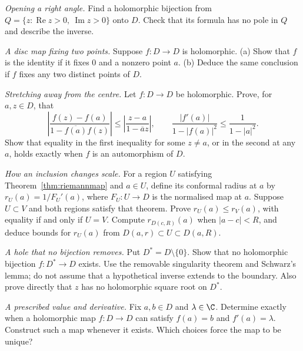 \begin{exercise}[$\star$]\label{ex:quadrant}
\emph{Opening a right angle.} Find a holomorphic bijection from
$Q=\{z:\operatorname{Re}z>0,\ \operatorname{Im}z>0\}$ onto $D$.
Check that its formula has no pole in $Q$ and describe the inverse.
\end{exercise}

\begin{exercise}[$\star\star$]\label{ex:schwarzfixed}
\emph{A disc map fixing two points.} Suppose $f:D\to D$ is holomorphic.
(a) Show that $f$ is the identity if it fixes $0$ and a nonzero point $a$.
(b) Deduce the same conclusion if $f$ fixes any two distinct points of $D$.
\end{exercise}

\begin{exercise}[$\star\star$]\label{ex:v9-schwarz-pick}
\emph{Stretching away from the centre.} Let $f:D\to D$ be holomorphic.
Prove, for $a,z\in D$, that
\[
 \left|\frac{f(z)-f(a)}{1-\overline{f(a)}f(z)}\right|
 \le\left|\frac{z-a}{1-\overline a z}\right|,
 \qquad
 \frac{|f'(a)|}{1-|f(a)|^2}\le\frac1{1-|a|^2}.
\]
Show that equality in the first inequality for some $z\ne a$, or in the
second at any $a$, holds exactly when $f$ is an automorphism of $D$.
\end{exercise}

\begin{exercise}[$\star\star$]\label{ex:v9-conformal-radius}
\emph{How an inclusion changes scale.} For a region $U$ satisfying
Theorem~\ref{thm:riemannmap} and $a\in U$, define its conformal radius at $a$
by $r_U(a)=1/F_U'(a)$, where $F_U:U\to D$ is the normalised map at $a$.
Suppose $U\subset V$ and both regions satisfy that theorem. Prove
$r_U(a)\le r_V(a)$, with equality if and only if $U=V$.
Compute $r_{D(c,R)}(a)$ when $|a-c|<R$, and deduce bounds for $r_U(a)$
from $D(a,r)\subset U\subset D(a,R)$.
\end{exercise}

\begin{exercise}[$\star\star$]\label{ex:v9-punctured-disc}
\emph{A hole that no bijection removes.} Put $D^*=D\setminus\{0\}$.
Show that no holomorphic bijection $f:D^*\to D$ exists.
Use the removable singularity theorem and Schwarz's lemma; do not assume
that a hypothetical inverse extends to the boundary.
Also prove directly that $z$ has no holomorphic square root on $D^*$.
\end{exercise}

\begin{exercise}[$\star\star$]\label{ex:v9-derivative-interpolation}
\emph{A prescribed value and derivative.} Fix $a,b\in D$ and $\lambda\in\C$.
Determine exactly when a holomorphic map $f:D\to D$ can satisfy
$f(a)=b$ and $f'(a)=\lambda$. Construct such a map whenever it exists.
Which choices force the map to be unique?
\end{exercise}

